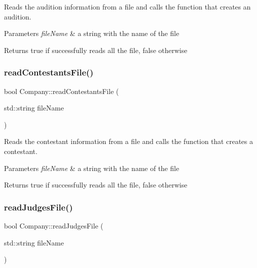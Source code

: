 Reads the audition information from a file and calls the function that creates an audition. 


\begin{DoxyParams}{Parameters}
{\em file\+Name} & a string with the name of the file \\
\hline
\end{DoxyParams}
\begin{DoxyReturn}{Returns}
true if successfully reads all the file, false otherwise 
\end{DoxyReturn}
\mbox{\label{class_company_af5f148bc24f2d7d74f2c4ada055bad64}} 
\subsubsection{\texorpdfstring{read\+Contestants\+File()}{readContestantsFile()}}
{\footnotesize\ttfamily bool Company\+::read\+Contestants\+File (\begin{DoxyParamCaption}\item[{std\+::string}]{file\+Name }\end{DoxyParamCaption})}



Reads the contestant information from a file and calls the function that creates a contestant. 


\begin{DoxyParams}{Parameters}
{\em file\+Name} & a string with the name of the file \\
\hline
\end{DoxyParams}
\begin{DoxyReturn}{Returns}
true if successfully reads all the file, false otherwise 
\end{DoxyReturn}
\mbox{\label{class_company_a5c53dbd29fab7972acbb7e92eeee2ee5}} 
\subsubsection{\texorpdfstring{read\+Judges\+File()}{readJudgesFile()}}
{\footnotesize\ttfamily bool Company\+::read\+Judges\+File (\begin{DoxyParamCaption}\item[{std\+::string}]{file\+Name }\end{DoxyParamCaption})}



